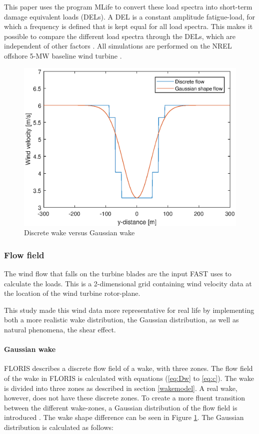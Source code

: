 This paper uses the program MLife to convert these load spectra into short-term damage equivalent loads (DELs). A DEL is a constant amplitude fatigue-load, for which a frequency is defined that is kept equal for all load spectra. This makes it possible to compare the different load spectra through the DELs, which are independent of other factors \cite{MLife,Wilson2017}. All simulations are performed on the NREL offshore 5-MW baseline wind turbine \cite{Jonkman2005}.


\begin{figure}
  \includegraphics[width=\linewidth]{./Figures/PlotGausDiscWakeDWake180U6yaw0.eps} %
  \caption{Discrete wake versus Gaussian wake} %
  \label{fig:disgaus}
\end{figure}


\subsubsection{Flow field} \label{sec:flowfield}
The wind flow that falls on the turbine blades are the input FAST uses to calculate the loads. This is a 2-dimensional grid containing wind velocity data at the location of the wind turbine rotor-plane.

This study made this wind data more representative for real life by implementing both a more realistic wake distribution, the Gaussian distribution, as well as natural phenomena, the shear effect.

\paragraph{Gaussian wake}
FLORIS describes a discrete flow field of a wake, with three zones. The flow field of the wake in FLORIS is calculated with equations (\ref{eq:Dw} to \ref{eq:c}). The wake is divided into three zones as described in section \ref{wakemodel}. A real wake, however, does not have these discrete zones. To create a more fluent transition between the different wake-zones, a Gaussian distribution of the flow field is introduced \cite{Bastankhah2016}. The wake shape difference can be seen in Figure \ref{fig:disgaus}.  The Gaussian distribution is calculated as follows: 

